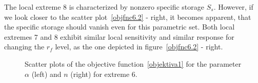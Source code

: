 \documentclass[review,times,3p,twocolumn,10pt]{elsarticle}
\begin{document}
The local extreme 8 is characterized by nonzero specific storage $S_s$. However, if we look closer to the scatter plot~\ref{objfnc6.2} - right, it becomes apparent, that the specific storage should vanish even for this parametric set. Both local extremes 7 and 8 exhibit similar local sensitivity and similar response for changing the $r_f$ level, as the one depicted in figure~\ref{objfnc6.2} - right.




\begin{figure}
\caption{Scatter plots of the objective function~\eqref{objektiva1} for the parameter $\alpha$ (left) and $n$ (right) for extreme 6.}
\label{objfnc6}
\end{figure}
\end{document}
